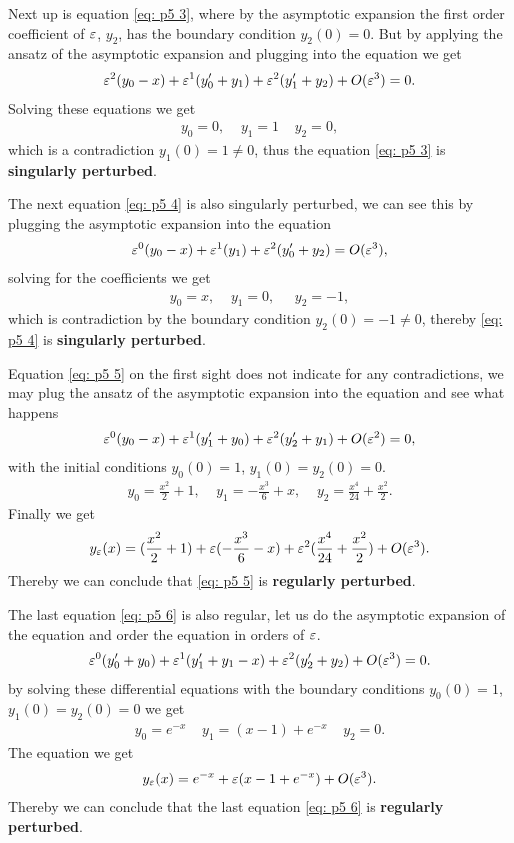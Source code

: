 Next up is equation \ref{eq: p5 3}, where by the asymptotic expansion the
first order coefficient of $\varepsilon$, $y_2$, has the boundary condition $y_2(0)
= 0$. But by applying the ansatz of the asymptotic expansion and plugging
into the equation we get
\begin{align}
    \varepsilon^2(y_0 - x) + \varepsilon^1 (y_0' + y_1) + \varepsilon^2(y_1' + y_2) + O(\varepsilon^3) =
    0.
\end{align}
Solving these equations we get
\begin{align}
    y_0 = 0, \;\;\;\; y_1 = 1 \;\;\;\; y_2 = 0 ,
\end{align}
which is a contradiction $y_1(0) = 1 \neq 0 $, thus the equation \ref{eq: p5
3} is \textbf{singularly perturbed}.

The next equation \ref{eq: p5 4} is also singularly perturbed, we
can see this by plugging the asymptotic expansion into the equation
\begin{align}
 \varepsilon^0 ( y_0 - x) + \varepsilon^1(y_1) + \varepsilon^2(y_0' + y_2) = O(\varepsilon^3),
\end{align}
solving for the coefficients we get
\begin{align}
    y_0 = x, \;\;\;\; y_1 = 0, \;\;\;\;\; y_2 = -1,
\end{align}
which is contradiction by the boundary condition $y_2(0) = -1 \neq 0$,
thereby \ref{eq: p5 4} is \textbf{singularly perturbed}.

Equation \ref{eq: p5 5} on the first sight does not indicate for any
contradictions, we may plug the ansatz of the asymptotic expansion into the
equation and see what happens
\begin{align}
    \varepsilon^0(y_0 -x) + \varepsilon^1(y_1' + y_0) + \varepsilon^2(y_2' +y_1) + O(\varepsilon^2) = 0,
\end{align}
with the initial conditions $y_0(0) = 1$, $y_1(0) = y_2(0) = 0$.
\begin{align}
    y_0 = \frac{x^2}{2} + 1, \;\;\;\;
    y_1 = -\frac{x^3}{6} + x, \;\;\;\;
    y_2 = \frac{x^4}{24} + \frac{x^2}{2}.
\end{align}
Finally we get
\begin{align}
    y_\varepsilon(x) = (\frac{x^2}{2}+1) + \varepsilon(-\frac{x^3}{6} -x)
    +\varepsilon^2(\frac{x^4}{24} + \frac{x^2}{2}) + O(\varepsilon^3).
\end{align}
Thereby we can conclude that \ref{eq: p5 5} is \textbf{regularly perturbed}.

The last equation \ref{eq: p5 6} is also regular, let us do the asymptotic
expansion of the equation and order the equation in orders of $\varepsilon$.
\begin{align}
    \varepsilon^0(y_0' + y_0) + \varepsilon^1(y_1' + y_1 -x) + \varepsilon^2(y_2' + y_2)+
    O(\varepsilon^3) = 0 .
\end{align}
by solving these differential equations with the boundary conditions $y_0(0)
= 1$, $y_1(0) = y_2(0) = 0$ we get
\begin{align}
    y_0 =  e^{-x} \;\;\;\; y_1 = (x-1) + e^{-x} \;\;\;\; y_2 = 0.
\end{align}
The equation we get
\begin{align}
    y_\varepsilon(x) = e^{-x} + \varepsilon(x-1 +e^{-x}) + O(\varepsilon^3).
\end{align}
Thereby we can conclude that the last equation \ref{eq: p5 6} is
\textbf{regularly perturbed}.
